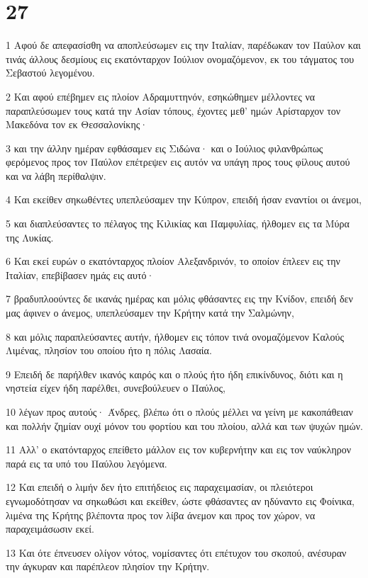 \chapter{27}

\par 1 Αφού δε απεφασίσθη να αποπλεύσωμεν εις την Ιταλίαν, παρέδωκαν τον Παύλον και τινάς άλλους δεσμίους εις εκατόνταρχον Ιούλιον ονομαζόμενον, εκ του τάγματος του Σεβαστού λεγομένου.
\par 2 Και αφού επέβημεν εις πλοίον Αδραμυττηνόν, εσηκώθημεν μέλλοντες να παραπλεύσωμεν τους κατά την Ασίαν τόπους, έχοντες μεθ' ημών Αρίσταρχον τον Μακεδόνα τον εκ Θεσσαλονίκης·
\par 3 και την άλλην ημέραν εφθάσαμεν εις Σιδώνα· και ο Ιούλιος φιλανθρώπως φερόμενος προς τον Παύλον επέτρεψεν εις αυτόν να υπάγη προς τους φίλους αυτού και να λάβη περίθαλψιν.
\par 4 Και εκείθεν σηκωθέντες υπεπλεύσαμεν την Κύπρον, επειδή ήσαν εναντίοι οι άνεμοι,
\par 5 και διαπλεύσαντες το πέλαγος της Κιλικίας και Παμφυλίας, ήλθομεν εις τα Μύρα της Λυκίας.
\par 6 Και εκεί ευρών ο εκατόνταρχος πλοίον Αλεξανδρινόν, το οποίον έπλεεν εις την Ιταλίαν, επεβίβασεν ημάς εις αυτό·
\par 7 βραδυπλοούντες δε ικανάς ημέρας και μόλις φθάσαντες εις την Κνίδον, επειδή δεν μας άφινεν ο άνεμος, υπεπλεύσαμεν την Κρήτην κατά την Σαλμώνην,
\par 8 και μόλις παραπλεύσαντες αυτήν, ήλθομεν εις τόπον τινά ονομαζόμενον Καλούς Λιμένας, πλησίον του οποίου ήτο η πόλις Λασαία.
\par 9 Επειδή δε παρήλθεν ικανός καιρός και ο πλούς ήτο ήδη επικίνδυνος, διότι και η νηστεία είχεν ήδη παρέλθει, συνεβούλευεν ο Παύλος,
\par 10 λέγων προς αυτούς· Άνδρες, βλέπω ότι ο πλούς μέλλει να γείνη με κακοπάθειαν και πολλήν ζημίαν ουχί μόνον του φορτίου και του πλοίου, αλλά και των ψυχών ημών.
\par 11 Αλλ' ο εκατόνταρχος επείθετο μάλλον εις τον κυβερνήτην και εις τον ναύκληρον παρά εις τα υπό του Παύλου λεγόμενα.
\par 12 Και επειδή ο λιμήν δεν ήτο επιτήδειος εις παραχειμασίαν, οι πλειότεροι εγνωμοδότησαν να σηκωθώσι και εκείθεν, ώστε φθάσαντες αν ηδύναντο εις Φοίνικα, λιμένα της Κρήτης βλέποντα προς τον λίβα άνεμον και προς τον χώρον, να παραχειμάσωσιν εκεί.
\par 13 Και ότε έπνευσεν ολίγον νότος, νομίσαντες ότι επέτυχον του σκοπού, ανέσυραν την άγκυραν και παρέπλεον πλησίον την Κρήτην.

